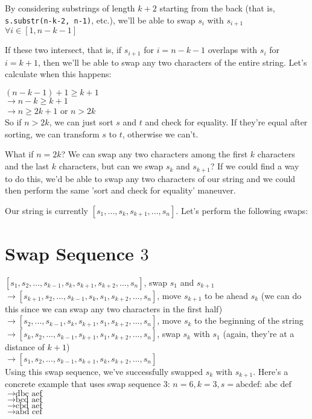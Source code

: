 \documentclass{article}
\begin{document}
By considering substrings of length $k+2$ starting from the back (that is, \texttt{s.substr(n-k-2, n-1)}, etc.), we'll be able to swap $s_i$ with $s_{i+1}$ $\forall i \in [1, n-k-1]$

If these two intersect, that is, if $s_{i+1}$ for $i=n-k-1$ overlaps with $s_i$ for $i = k+1$, then we'll be able to swap any two characters of the entire string. Let's calculate when this happens:

$(n-k-1)+1\ge k+1$\\
$\rightarrow n-k\ge k+1$\\
$\rightarrow n\ge 2k+1$ or $n > 2k$\\

So if $n>2k$, we can just sort $s$ and $t$ and check for equality. If they're equal after sorting, we can transform $s$ to $t$, otherwise we can't.

What if $n=2k$? We can swap any two characters among the first $k$ characters and the last $k$ characters, but can we swap $s_k$ and $s_{k+1}$? If we could find a way to do this, we'd be able to swap any two characters of our string and we could then perform the same 'sort and check for equality' maneuver.

Our string is currently $[s_1, ..., s_k, s_{k+1}, ..., s_n]$. Let's perform the following swaps:
\section{Swap Sequence $3$}
$[s_1, s_2, ..., s_{k-1}, s_k, s_{k+1}, s_{k+2}, ..., s_n]$, swap $s_1$ and $s_{k+1}$\\
$\rightarrow [s_{k+1}, s_2, ..., s_{k-1}, s_k, s_1, s_{k+2}, ..., s_n]$, move $s_{k+1}$ to be ahead $s_k$ (we can do this since we can swap any two characters in the first half)\\
$\rightarrow [s_2, ..., s_{k-1}, s_k, s_{k+1},s_1, s_{k+2}, ..., s_n]$, move $s_k$ to the beginning of the string\\
$\rightarrow [s_k, s_2, ..., s_{k-1}, s_{k+1},s_1, s_{k+2}, ..., s_n]$, swap $s_k$ with $s_1$ (again, they're at a distance of $k+1$)\\
$\rightarrow [s_1, s_2, ..., s_{k-1}, s_{k+1},s_k, s_{k+2}, ..., s_n]$\\

Using this swap sequence, we've successfully swapped $s_k$ with $s_{k+1}$. Here's a concrete example that uses swap sequence $3$: $n=6, k=3, s=\text{abcdef}$:
$\text{abc def}$\\
$\rightarrow\text{dbc aef}$\\
$\rightarrow\text{bcd aef}$\\
$\rightarrow\text{cbd aef}$\\
$\rightarrow\text{abd cef}$\\
\end{document}

